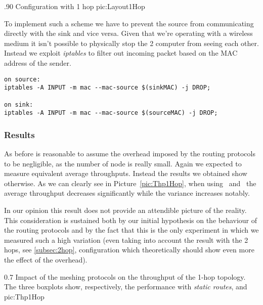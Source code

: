                 {.90\columnwidth}
                {Configuration with 1 hop}
                {pic:Layout1Hop}

        To implement such a scheme we have to prevent  the source
        from communicating directly with the sink and vice versa. Given
        that we're operating with a wireless medium it isn't possible
        to physically stop the 2 computer from seeing each
        other. Instead we exploit \emph{iptables} to filter out incoming
        packet based on the MAC address of the sender.
        
        \begin{verbatim}
on source:
iptables -A INPUT -m mac --mac-source $(sinkMAC) -j DROP;

on sink:
iptables -A INPUT -m mac --mac-source $(sourceMAC) -j DROP;
    \end{verbatim}

\subsubsection{Results}
      As before is reasonable to assume the overhead imposed by
      the routing protocols to be negligible, as the number of node is
      really small. Again we expected to measure equivalent average
      throughputs. Instead the results we obtained show otherwise. 
      As we can clearly see in  Picture~\ref{pic:Thp1Hop}, when using
      \batman\ and \olsr\, the average
      throughput decreases significantly while the variance increases notably.

      In our opinion this result does not provide an attendible
      picture of the reality. This consideration is sustained both by
      our initial hypothesis on the behaviour of the routing protocols
      and by the fact that this is the only experiment in which we
      measured such a high variation (even taking into account the
      result with the 2 hops, see \ref{subsec:2hop}, configuration
      which theoretically should show even more the effect of the overhead).

                {0.7 \columnwidth}
                {Impact of the meshing protocols on the throughput of the
                 1-hop topology. The three boxplots show, respectively, the
                 performance with \emph{static routes}, \emph{\batman} and
                 \emph{\olsr}}
                {pic:Thp1Hop}

